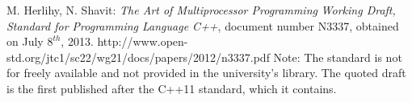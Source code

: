\documentclass[a4paper,10pt]{article}
\begin{document}
\begin{thebibliography}{9}
    M. Herlihy, N. Shavit:
   \emph{The Art of Multiprocessor Programming}
	\emph{Working Draft, Standard for Programming Language C++},
	document number N3337, obtained on July $8^{th}$, 2013.	
	http://www.open-std.org/jtc1/sc22/wg21/docs/papers/2012/n3337.pdf
	\newline
	Note: The standard is not for freely available and not provided in the university's  library. The quoted draft is the first published after the C++11 standard, which it contains.

\end{thebibliography}
\end{document}
